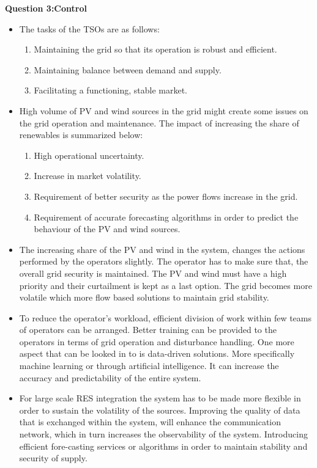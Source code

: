 {\textbf{Question 3:Control}}
\begin{itemize}
    \item The tasks of the TSOs are as follows:
    \begin{enumerate}
        \item Maintaining the grid so that its operation is robust and efficient.
        \item Maintaining balance between demand and supply.
        \item Facilitating a functioning, stable market.
    \end{enumerate}
    \item High volume of PV and wind sources in the grid might create some issues on the grid operation and maintenance. The impact of increasing the share of renewables is summarized below:
    \begin{enumerate}
        \item High operational uncertainty.
        \item Increase in market volatility. 
        \item Requirement of better security as the power flows increase in the grid.
        \item Requirement of accurate forecasting algorithms in order to predict the behaviour of the PV and wind sources.
    \end{enumerate}
    \item  The increasing share of the PV and wind in the system, changes the actions performed by the operators slightly. The operator has to make sure that, the overall grid security is maintained. The PV and wind must have a high priority and their curtailment is kept as a last option. The grid becomes more volatile which more flow based solutions to maintain grid stability.
    \item To reduce the operator's workload, efficient division of work within few teams of operators can be arranged. Better training can be provided to the operators in terms of grid operation and disturbance handling.
    One more aspect that can be looked in to is data-driven solutions. More specifically machine learning or through artificial intelligence. It can increase the accuracy and predictability of the entire system.
    \item For large scale RES integration the system has to be made more flexible in order to sustain the volatility of the sources. Improving the quality of data that is exchanged within the system, will enhance the communication network, which in turn increases the observability of the system. Introducing efficient fore-casting services or algorithms in order to maintain stability and security of supply.
\end{itemize}
